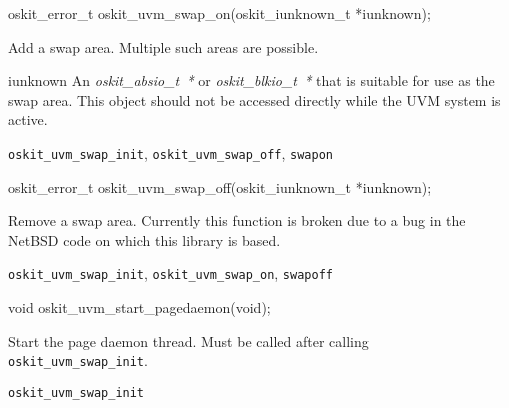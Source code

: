 \begin{apisyn}

        \funcproto oskit_error_t oskit_uvm_swap_on(oskit_iunknown_t *iunknown);
\end{apisyn}
\begin{apidesc}
        Add a swap area.  Multiple such areas are possible.
\end{apidesc}
\begin{apiparm}
        \item[iunknown]
                An \emph{oskit_absio_t~*} or \emph{oskit_blkio_t~*} that is
                suitable for use as the swap area.  This object should not be
                accessed directly while the UVM system is active.
\end{apiparm}
\begin{apirel}
        {\tt oskit_uvm_swap_init}, {\tt oskit_uvm_swap_off}, {\tt swapon}
\end{apirel}

\begin{apisyn}

        \funcproto oskit_error_t oskit_uvm_swap_off(oskit_iunknown_t *iunknown);
\end{apisyn}
\begin{apidesc}
        Remove a swap area.   Currently this function is broken
        due to a bug in the NetBSD code on which this library is based.
\end{apidesc}
\begin{apirel}
        {\tt oskit_uvm_swap_init}, {\tt oskit_uvm_swap_on}, {\tt swapoff}
\end{apirel}

\begin{apisyn}

        \funcproto void oskit_uvm_start_pagedaemon(void);
\end{apisyn}
\begin{apidesc}
        Start the page daemon thread.  Must be called after calling
        {\tt oskit_uvm_swap_init}.
\end{apidesc}
\begin{apirel}
        {\tt oskit_uvm_swap_init}
\end{apirel}

